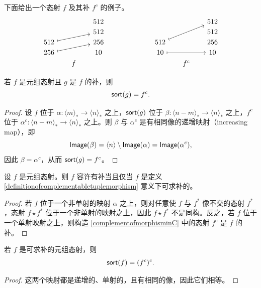 \begin{example}
    下面给出一个态射 $f$ 及其补 $ f^c$ 的例子。
        \[ \begin{tikzcd} [row sep = 1, column sep = 16]
     & & 512 & & & & & & 512 \\
     & & 512 & & & &  & & 512\\
    512 \ar[rru,mapsto] & & 256 & & & & 512 \ar[rruu, mapsto] & & 256\\
    256 \ar[rru,mapsto] & & 10 & & & & 10\ar[rr, mapsto]  & & 10 \\
     & f & & & & & & f^c &
    \end{tikzcd} \]
\end{example}

\begin{proposition}
    若 $f$ 是元组态射且 $g$ 是 $f$ 的补，则
    \[
    \mathsf{sort}(g) = f^c.
    \]
\end{proposition}
\begin{proof}
    设 $f$ 位于 $\alpha:\langle m \rangle_* \to \langle n \rangle_*$ 之上，$\mathsf{sort}(g)$ 位于 $\beta: \langle n - m \rangle_* \to \langle n \rangle_*$ 之上，$f^c$ 位于 $\alpha^c:\langle n - m \rangle_* \to \langle n \rangle_*$ 之上。则 $\beta$ 与 $\alpha^c$ 是有相同像的递增映射（increasing map），即
    \[\mathsf{Image}(\beta) = \langle n \rangle \setminus \mathsf{Image}(\alpha) = \mathsf{Image}(\alpha^c),\]
    因此 $\beta = \alpha^c$，从而 $\mathsf{sort}(g) = f^c$。
\end{proof}

\begin{proposition}
    设 $f$ 是元组态射。则 $f$ 容许有补当且仅当 $f$ 是定义 \ref{definitionofcomplementabletuplemorphism} 意义下可求补的。
\end{proposition}

\begin{proof}
    若 $f$ 位于一个非单射的映射 $\alpha$ 之上，则对任意使 $f$ 与 $f^*$ 像不交的态射 $f^*$，态射 $f \star f^*$ 位于一个非单射的映射之上，因此 $f \star f^*$ 不是同构。反之，若 $f$ 位于一个单射映射之上，则构造 \ref{complementofmorphisminC} 中的态射 $f^c$ 是 $f$ 的补。
\end{proof}

\begin{proposition}
    若 $f$ 是可求补的元组态射，则
    \[
    \mathsf{sort}(f) = (f^c)^c.
    \]
\end{proposition}

\begin{proof}
    这两个映射都是递增的、单射的，且有相同的像，因此它们相等。
\end{proof}



